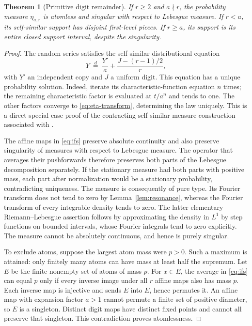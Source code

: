 \documentclass[11pt,a4paper]{article}
\newtheorem{theorem}{Theorem}[section]
\theoremstyle{definition}
\theoremstyle{remark}
\begin{document}
\begin{theorem}[Primitive digit remainder]\label{thm:primitive}
If $r\ge2$ and $a\nmid r$, the probability measure $\eta_{a,r}$ is
atomless and singular with respect to Lebesgue measure. If $r<a$, its
self-similar support has disjoint first-level pieces. If $r\ge a$, its
support is its entire closed support interval, despite the singularity.
\end{theorem}
\begin{proof}
The random series satisfies the self-similar distributional equation
\begin{equation}\label{eq:ifs}
 Y\ \stackrel{d}{=}\ \frac{Y'}a+\frac{J-(r-1)/2}{r},
\end{equation}
with $Y'$ an independent copy and $J$ a uniform digit. This equation has a
unique probability solution. Indeed, iterate its characteristic-function
equation $n$ times; the remaining characteristic factor is evaluated at
$t/a^n$ and tends to one. The other factors converge to
\eqref{eq:eta-transform}, determining the law uniquely. This is a direct
special-case proof of the contracting self-similar measure construction
associated with \cite{hutchinson}.

The affine maps in \eqref{eq:ifs} preserve absolute continuity and also
preserve singularity of measures with respect to Lebesgue measure. The
operator that averages their pushforwards therefore preserves both parts
of the Lebesgue decomposition separately. If the stationary measure had
both parts with positive mass, each part after normalization would be a
stationary probability, contradicting uniqueness. The measure is consequently
of pure type. Its Fourier transform does not tend to zero by
Lemma~\ref{lem:resonance}, whereas the Fourier transform of every integrable
density tends to zero. The latter elementary Riemann--Lebesgue assertion
follows by approximating the density in $L^1$ by step functions on bounded
intervals, whose Fourier integrals tend to zero explicitly. The measure
cannot be absolutely continuous, and hence is purely singular.

To exclude atoms, suppose the largest atom mass were $p>0$. Such a maximum
is attained: only finitely many atoms can have mass at least half the
supremum. Let $E$ be the finite nonempty set of atoms of mass $p$.
For $x\in E$, the average in \eqref{eq:ifs} can equal $p$ only if every
inverse image under all $r$ affine maps also has mass $p$. Each inverse
map is injective and sends $E$ into $E$, hence permutes it. An affine map
with expansion factor $a>1$ cannot permute a finite set of positive diameter,
so $E$ is a singleton. Distinct digit maps have distinct fixed points and
cannot all preserve that singleton. This contradiction proves atomlessness.


\end{proof}
\end{document}
